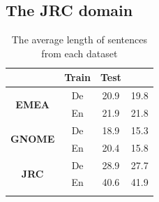 
\subsection{The JRC domain} 

\begin{table}[h!]
\centering
\begin{tabular}{cccc}
\Xhline{3\arrayrulewidth}
\multicolumn{2}{c}{}        & \textbf{Train}                        & \textbf{Test}                                 \\ \hline
\multirow{2}{*}{\textbf{EMEA}}  & De & 20.9   & 19.8  \\
                       & En & 21.9 & 21.8           \\ \hline
\multirow{2}{*}{\textbf{GNOME}} & De & 18.9   & 15.3         \\
                       & En & 20.4  & 15.8        \\ \hline
\multirow{2}{*}{\textbf{JRC}}   & De & 28.9  & 27.7  \\
                       & En & 40.6  & 41.9  \\\Xhline{3\arrayrulewidth}
\end{tabular}
\caption{The average length of sentences from each dataset}
\label{Tab:mean_sentences}
\end{table}

